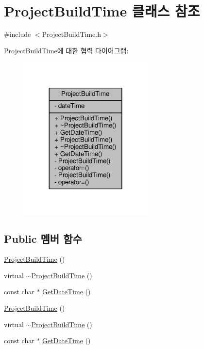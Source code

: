 \hypertarget{class_project_build_time}{}\section{Project\+Build\+Time 클래스 참조}
\label{class_project_build_time}


{\ttfamily \#include $<$Project\+Build\+Time.\+h$>$}



Project\+Build\+Time에 대한 협력 다이어그램\+:
\nopagebreak
\begin{figure}[H]
\begin{center}
\leavevmode
\includegraphics[width=192pt]{class_project_build_time__coll__graph}
\end{center}
\end{figure}
\subsection*{Public 멤버 함수}
\begin{DoxyCompactItemize}
\item 
\hyperlink{class_project_build_time_aff2d00154de73617b538be918787041b}{Project\+Build\+Time} ()
\item 
virtual \hyperlink{class_project_build_time_a066dc4a080ad39d1c05f5b97df73fe22}{$\sim$\+Project\+Build\+Time} ()
\item 
const char $\ast$ \hyperlink{class_project_build_time_a27745d10f4714ff73bb60f59abc104c1}{Get\+Date\+Time} ()
\item 
\hyperlink{class_project_build_time_aff2d00154de73617b538be918787041b}{Project\+Build\+Time} ()
\item 
virtual \hyperlink{class_project_build_time_a2989eb247c996777b0b022acc65ee841}{$\sim$\+Project\+Build\+Time} ()
\item 
const char $\ast$ \hyperlink{class_project_build_time_af4649c158def49e0904ae138ec6edb59}{Get\+Date\+Time} ()
\end{DoxyCompactItemize}
